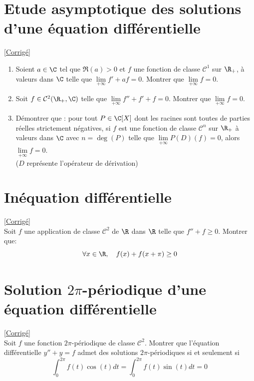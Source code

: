 \documentclass{book}
\begin{document}
\section{Etude asymptotique des solutions d'une équation différentielle }
\textcolor{blue}{\hyperref[sec:etude-asymptotique-des-solutions-dune-equation-differentielle-etoile4]{[Corrigé]}}\\
\label{Etude asymptotique des solution d'une équation différentielle}
\begin{enumerate}[leftmargin=*]
	\item Soient $a \in \C$ tel que $\Re(a)>0$ et $f$ une fonction de classe $\mathcal{C}^1$ sur $\R_+$, à valeurs dans $\C$ telle que $\lim\limits_{+\infty} f'+af=0$. Montrer que $\lim\limits_{+\infty} f=0$.
	\item Soit $f\in \mathcal{C}^2(\R_+,\C)$ telle que $\lim\limits_{+\infty}f''+f'+f=0$. Montrer que $\lim\limits_{+\infty} f=0$.
	\item Démontrer que : pour tout $P \in \C[X]$ dont les racines sont toutes de parties réelles strictement négatives, si $f$ est une fonction de classe $\mathcal{C}^n$ sur $\R_+$ à valeurs dans $\C$ avec $n=\deg(P)$ telle que $\lim\limits_{+\infty} P(D)(f)=0$, alors $\lim\limits_{+\infty}f=0$. \\ ($D$ représente l'opérateur de dérivation)
\end{enumerate}

\section{Inéquation différentielle}
\textcolor{blue}{\hyperref[sec:inequation-differentielle]{[Corrigé]}}\\
\label{Inéquation différentielle}
Soit $f$ une application de classe $\mathcal{C}^2$ de $\R$ dans $\R$ telle que $f''+f\geq0$. Montrer que: $$\forall x\in\R,\quad f(x)+f(x+\pi)\geq0$$

\section{Solution $2\pi$-périodique d'une équation différentielle}
\textcolor{blue}{\hyperref[sec:solution-2pi-periodique-dune-equation-differentielle]{[Corrigé]}}\\
\label{Solution 2pi-périodique d'une équation différentielle}
Soit $f$ une fonction $2\pi$-périodique de classe $\mathcal{C}^2$. Montrer que l'équation différentielle $y''+y=f$ admet des solutions $2\pi$-périodiques si et seulement si $$\int_0^{2\pi}f(t)\cos(t)dt=\int_0^{2\pi}f(t)\sin(t)dt=0$$
\end{document}
